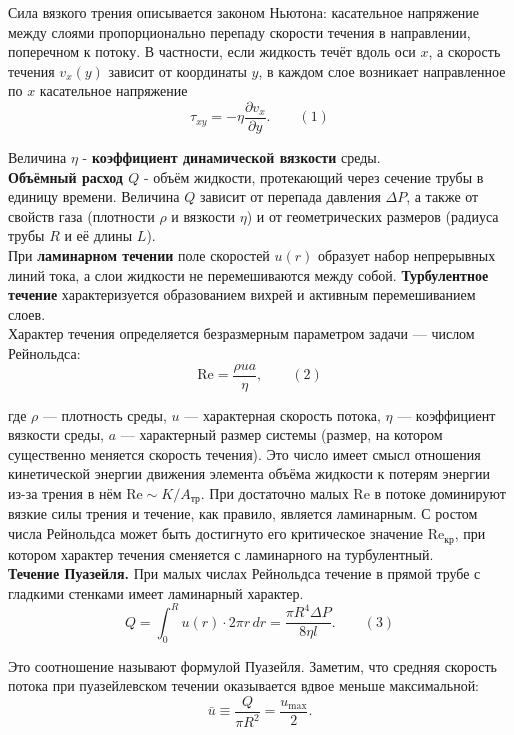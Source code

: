\documentclass[a4paper]{article}
\begin{document}
	Сила вязкого трения описывается законом Ньютона: касательное напряжение между слоями пропорционально перепаду скорости течения в направлении, поперечном к потоку. В частности, если жидкость течёт вдоль оси $x$, а скорость течения $v_x(y)$ зависит от координаты $y$, в каждом слое возникает направленное по $x$ касательное напряжение
	\[
	\tau_{xy} = -\eta \frac{\partial v_x}{\partial y}. \qquad (1)
	\]
	
	Величина $\eta$ - \textbf{коэффициент динамической вязкости} среды.\\
	
	\textbf{Объёмный расход $Q$} - объём жидкости, протекающий через сечение трубы в единицу времени. Величина $Q$ зависит от перепада давления $\Delta P$, а также от свойств газа (плотности $\rho$ и вязкости $\eta$) и от геометрических размеров (радиуса трубы $R$ и её длины $L$).\\
	
	При \textbf{ламинарном течении} поле скоростей $u(r)$ образует набор непрерывных линий тока, а слои жидкости не перемешиваются между собой. \textbf{Турбулентное течение} характеризуется образованием вихрей и активным перемешиванием слоев.\\
	
	Характер течения определяется безразмерным параметром задачи — числом Рейнольдса:
	\[
	\text{Re} = \frac{\rho u a}{\eta}, \qquad (2)
	\]
	
	где $\rho$ — плотность среды, $u$ — характерная скорость потока, $\eta$ — коэффициент вязкости среды, $a$ — характерный размер системы (размер, на котором существенно меняется скорость течения). Это число имеет смысл отношения кинетической энергии движения элемента объёма жидкости к потерям энергии из-за трения в нём $\text{Re} \sim K/A_{\text{тр}}$. При достаточно малых $\text{Re}$ в потоке доминируют вязкие силы трения и течение, как правило, является ламинарным. С ростом числа Рейнольдса может быть достигнуто его критическое значение $\text{Re}_{\text{кр}}$, при котором характер течения сменяется с ламинарного на турбулентный.\\
	
	\textbf{Течение Пуазейля.} При малых числах Рейнольдса течение в прямой трубе с гладкими стенками имеет ламинарный характер.
	\[
	Q = \int_{0}^{R} u(r) \cdot 2\pi r \, dr = \frac{\pi R^4 \Delta P}{8\eta l}. \qquad (3)
	\]
	
	Это соотношение называют формулой Пуазейля. Заметим, что средняя скорость потока при пуазейлевском течении оказывается вдвое меньше максимальной:
	\[
	\bar{u} \equiv \frac{Q}{\pi R^2} = \frac{u_{\mathrm{max}}}{2}.
	\]
	
\end{document}
